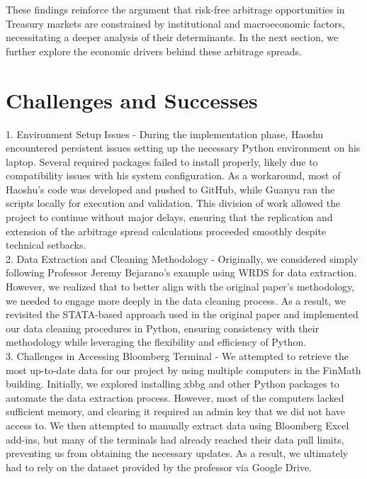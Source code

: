 \documentclass{article}
\begin{document}
These findings reinforce the argument that risk-free arbitrage opportunities in Treasury markets are constrained by institutional and macroeconomic factors, necessitating a deeper analysis of their determinants. In the next section, we further explore the economic drivers behind these arbitrage spreads.




\newpage




\section{Challenges and Successes}


1. Environment Setup Issues - During the implementation phase, Haoshu encountered persistent issues setting up the necessary Python environment on his laptop. Several required packages failed to install properly, likely due to compatibility issues with his system configuration. As a workaround, most of Haoshu’s code was developed and pushed to GitHub, while Guanyu ran the scripts locally for execution and validation. This division of work allowed the project to continue without major delays, ensuring that the replication and extension of the arbitrage spread calculations proceeded smoothly despite technical setbacks. \\


2. Data Extraction and Cleaning Methodology - Originally, we considered simply following Professor Jeremy Bejarano’s example using WRDS for data extraction. However, we realized that to better align with the original paper’s methodology, we needed to engage more deeply in the data cleaning process. As a result, we revisited the STATA-based approach used in the original paper and implemented our data cleaning procedures in Python, ensuring consistency with their methodology while leveraging the flexibility and efficiency of Python. \\

3. Challenges in Accessing Bloomberg Terminal - We attempted to retrieve the most up-to-date data for our project by using multiple computers in the FinMath building. Initially, we explored installing xbbg and other Python packages to automate the data extraction process. However, most of the computers lacked sufficient memory, and clearing it required an admin key that we did not have access to. We then attempted to manually extract data using Bloomberg Excel add-ins, but many of the terminals had already reached their data pull limits, preventing us from obtaining the necessary updates. As a result, we ultimately had to rely on the dataset provided by the professor via Google Drive.
\end{document}
